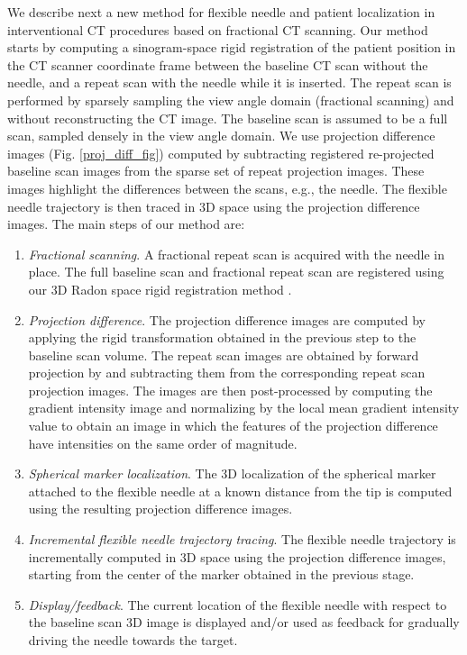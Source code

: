 We describe next a new method for flexible needle and patient localization in interventional CT procedures based on fractional CT scanning. Our method starts by computing a sinogram-space rigid registration of the patient position in the CT scanner coordinate frame between the baseline CT scan without the needle, and a repeat scan with the needle while it is inserted. The repeat scan is performed by sparsely sampling the view angle domain (fractional scanning) and without reconstructing the CT image. The baseline scan is assumed to be a full scan, sampled densely in the view angle domain. We use projection difference images (Fig. \ref{proj_diff_fig}) computed by subtracting registered re-projected baseline scan images from the sparse set of repeat projection images. These images highlight the differences between the scans, e.g., the needle. The flexible needle trajectory is then traced in 3D space using the projection difference images. The main steps of our method are:
\begin{enumerate}
\item \textit{Fractional scanning}. A fractional repeat scan is acquired with the needle in place. The full baseline scan and fractional repeat scan are registered using our 3D Radon space rigid registration method \cite{medan2017sparse}.
\item \textit{Projection difference}. The projection difference images are computed by applying the rigid transformation obtained in the previous step to the baseline scan volume. The repeat scan images are obtained by forward projection by and subtracting them from the corresponding repeat scan projection images. The images are then post-processed by computing the gradient intensity image and normalizing by the local mean gradient intensity value to obtain an image in which the features of the projection difference have intensities on the same order of magnitude.
\item \textit{Spherical marker localization}. The 3D localization of the spherical marker attached to the flexible needle at a known distance from the tip is computed using the resulting projection difference images.
\item \textit{Incremental flexible needle trajectory tracing}. The flexible needle trajectory is incrementally computed in 3D space using the projection difference images, starting from the center of the marker obtained in the previous stage. 
\item \textit{Display/feedback}. The current location of the flexible needle with respect to the baseline scan 3D image is displayed and/or used as feedback for gradually driving the needle towards the target.
\end{enumerate}
